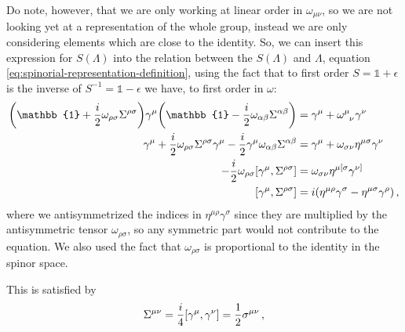 \documentclass[main.tex]{subfiles}
\begin{document}
Do note, however, that we are only working at linear order in \(\omega_{\mu \nu }\), so we are not looking yet at a representation of the whole group, instead we are only considering elements which are close to the identity. 
So, we can insert this expression for \(S(\Lambda )\) into the relation between the \(S(\Lambda )\) and \(\Lambda \), equation \eqref{eq:spinorial-representation-definition}, using the fact that to first order \(S = \mathbb{1} + \epsilon \) is the inverse of \(S^{-1} = \mathbb{1} - \epsilon \) we have, to first order in \(\omega \): 
%
\begin{align}
\qty(\mathbb{1} + \frac{i}{2} \omega_{\rho \sigma } \Sigma^{\rho \sigma }) \gamma^{\mu } \qty(\mathbb{1} - \frac{i}{2} \omega_{\alpha \beta } \Sigma^{\alpha \beta }) &= \gamma^{ \mu} +\tensor{\omega}{^{\mu }_{\nu }} \gamma^{\nu } \\
\gamma^{\mu } + \frac{i}{2} \omega_{\rho \sigma } \Sigma^{\rho \sigma } \gamma^{ \mu } - \frac{i}{2} \gamma^{\mu }\omega_{\alpha \beta } \Sigma^{\alpha \beta } &= \gamma^{\mu } + \omega_{\sigma \nu } \eta^{\mu \sigma } \gamma^{\nu }  \\
-\frac{i}{2} \omega_{\rho \sigma } \qty[\gamma^{\mu }, \Sigma^{\rho \sigma }] &= \omega_{\sigma \nu } \eta^{\mu [\sigma } \gamma^{\nu ]}  \\
\qty[\gamma^{\mu }, \Sigma^{\rho \sigma }] &= i \qty(\eta^{\mu \rho } \gamma^{\sigma } - \eta^{\mu \sigma } \gamma^{\rho })
\,,
\end{align}
%
where we antisymmetrized the indices in \(\eta^{\mu \rho } \gamma^{\sigma }\) since they are multiplied by the antisymmetric tensor \(\omega_{\rho \sigma }\), so any symmetric part would not contribute to the equation. 
We also used the fact that \(\omega_{\rho \sigma } \) is proportional to the identity in the spinor space. 

\begin{claim}
This is satisfied by 
%
\begin{align}
\Sigma^{\mu \nu } = \frac{i}{4} \qty[\gamma^{\mu }, \gamma^{\nu }] = \frac{1}{2} \sigma^{\mu \nu }
\,,
\end{align}
\end{claim}
\end{document}
